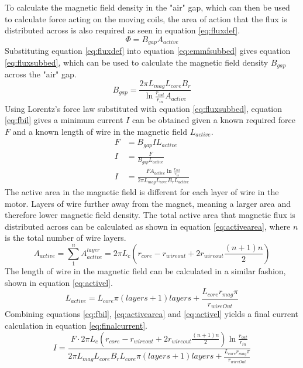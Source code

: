 \documentclass[a4paper,12pt]{article}
\begin{document}
To calculate the magnetic field density in the "air" gap, which can then be used to calculate force acting on the moving coils, the area of action that the flux is distributed across is also required as seen in equation \ref{eq:fluxdef}.
\begin{equation}\label{eq:fluxdef}
\Phi = B_{gap}A_{active}
\end{equation}
Substituting equation \ref{eq:fluxdef} into equation \ref{eq:emmfsubbed} gives equation \ref{eq:fluxsubbed}, which can be used to calculate the magnetic field density $B_{gap}$ across the "air" gap.
\begin{equation}\label{eq:fluxsubbed}
B_{gap} = \frac{2\pi L_{mag} L_{core} B_r}{\ln{\frac{r_{out}}{r_{in}}}A_{active}}
\end{equation}
Using Lorentz's force law substituted with equation \ref{eq:fluxsubbed}, equation \ref{eq:fbil} gives a minimum current $I$ can be obtained given a known required force $F$ and a known length of wire in the magnetic field $L_{active}$.
\begin{equation}\label{eq:fbil}
\begin{split}
F & = B_{gap}IL_{active}\\
I & = \frac{F}{B_{gap}L_{active}}\\
I & = \frac{F A_{active} \ln{\frac{r_{out}}{r_{in}}}}{2\pi L_{mag} L_{core} B_r L_{active}}
\end{split}
\end{equation}
The active area in the magnetic field is different for each layer of wire in the motor. Layers of wire further away from the magnet, meaning a larger area and therefore lower magnetic field density. The total active area that magnetic flux is distributed across can be calculated as shown in equation \ref{eq:activearea}, where $n$ is the total number of wire layers.
\begin{equation}\label{eq:activearea}
A_{active} = \sum_{1}^{n}{A_{active}^{layer}} = 2\pi L_c (r_{core}-r_{wireout} + 2r_{wireout} \frac{(n+1)n}{2})
\end{equation}
The length of wire in the magnetic field can be calculated in a similar fashion, shown in equation \ref{eq:activel}.
\begin{equation}\label{eq:activel}
L_{active} = L_{core}\pi(layers+1)layers + \frac{L_{core} r_{mag} \pi}{r_{wireOut}}
\end{equation}
Combining equations \ref{eq:fbil}, \ref{eq:activearea} and \ref{eq:activel} yields a final current calculation in equation \ref{eq:finalcurrent}.
\begin{equation}\label{eq:finalcurrent}
I = \frac{F\cdot 2\pi L_c (r_{core}-r_{wireout} + 2r_{wireout} \frac{(n+1)n}{2}) \ln{\frac{r_{out}}{r_{in}}}}{2\pi L_{mag} L_{core} B_r L_{core}\pi(layers+1)layers + \frac{L_{core} r_{mag} \pi}{r_{wireOut}}}
\end{equation}
\end{document}

